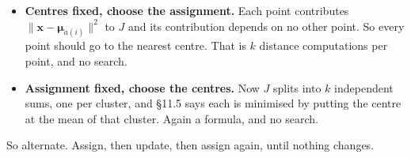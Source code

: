 \documentclass[11pt]{article}
\theoremstyle{plain}
\theoremstyle{definition}
\theoremstyle{remark}
\newcommand{\vc}[1]{\mathbf{#1}}
\newcommand{\norm}[1]{\lVert #1\rVert}
\newcommand{\bmu}{\boldsymbol{\mu}}
\begin{document}
\begin{itemize}[leftmargin=1.4em,itemsep=5pt]
  \item \textbf{Centres fixed, choose the assignment.} Each point contributes
        $\norm{\vc{x}-\bmu_{a(i)}}^{2}$ to $J$ and its contribution depends
        on no other point. So every point should go to the nearest centre. That
        is $k$ distance computations per point, and no search.
  \item \textbf{Assignment fixed, choose the centres.} Now $J$ splits into $k$
        independent sums, one per cluster, and \S11.5 says each is minimised by
        putting the centre at the mean of that cluster. Again a formula, and no
        search.
\end{itemize}

\noindent So alternate. Assign, then update, then assign again, until nothing
changes.

\begin{center}
\end{center}

\end{document}
